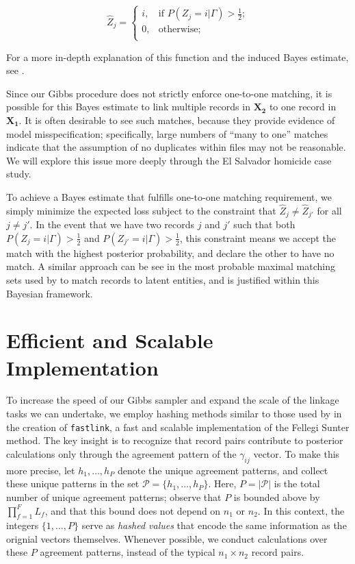 \documentclass[12pt,letterpaper]{article}
\newcommand{\1}[1]{\mathbb{I}\!\left[#1\right]} %
\begin{document}
\[\hat{Z}_j =\begin{cases} 
	i,  & \text{if } P(Z_j = i |\Gamma) > \frac{1}{2}; \\
	0,  & \text{otherwise} ; \\
\end{cases}\]

For a more in-depth explanation of this function and the induced Bayes
estimate, see \citep{sadinle_bayesian_2017}.

Since our Gibbs procedure does not strictly enforce one-to-one matching, it is possible for this Bayes estimate to link multiple records in $\bm{X_2}$ to one record in $\bm{X_1}$. It is often desirable to see such matches, because they provide evidence of model misspecification; specifically, large numbers of ``many to one'' matches indicate that the assumption of no duplicates within files may not be reasonable. We will explore this issue more deeply through the El Salvador homicide case study. 

To achieve a Bayes estimate that fulfills one-to-one matching requirement, we simply minimize the expected loss subject to the constraint that $\hat{Z}_j \neq \hat{Z}_{j'}$ for all $j \neq j'$. In the event that we have two records $j$ and $j'$ such that both $P(Z_j = i |\Gamma) > \frac{1}{2}$ and $ P(Z_{j'} = i |\Gamma) > \frac{1}{2}$, this constraint means we accept the match with the highest posterior probability, and declare the other to have no match.  A similar approach can be see in the most probable maximal matching sets used by \citep{steorts_2013} to match records to latent entities, and is justified within this Bayesian framework.

\section{Efficient and Scalable Implementation}
\label{sec:efficiency}

To increase the speed of our Gibbs sampler and expand the scale of the linkage tasks we can undertake, we employ hashing methods similar to those used by \cite{enamorado2019using} in the creation of \texttt{fastlink}, a fast and scalable implementation of the Fellegi Sunter method. The key insight is to recognize that record pairs contribute to posterior calculations only through the agreement pattern of the $\gamma_{ij}$ vector. To make this more precise, let $h_1, \ldots, h_P$ denote the unique agreement patterns, and collect these unique patterns in the set $\mathcal{P} = \{h_1, \ldots, h_P\}$. Here, 
$P = |\mathcal{P}|$ is the total number of unique agreement
patterns; observe that \(P\) is bounded above by \(\prod_{f=1}^F L_f\), and that this bound does not depend on \(n_1\) or \(n_2\). In this context, the integers $\{1, \ldots, P\}$ serve as \emph{hashed values} that encode the same information as the orignial vectors themselves. Whenever possible, we conduct calculations over these \(P\) agreement
patterns, instead of the typical \(n_1 \times n_2\) record pairs.
\end{document}
